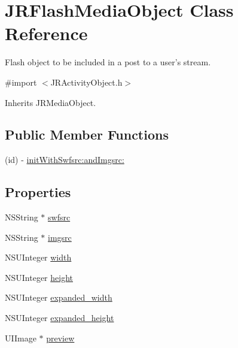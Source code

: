 \hypertarget{interface_j_r_flash_media_object}{
\section{JRFlashMediaObject Class Reference}
\label{interface_j_r_flash_media_object}
}


Flash object to be included in a post to a user's stream.  




{\ttfamily \#import $<$JRActivityObject.h$>$}



Inherits JRMediaObject.

\subsection*{Public Member Functions}
\begin{DoxyCompactItemize}
\item 
(id) -\/ \hyperlink{interface_j_r_flash_media_object_aed4ac7b682373f36379eb81dea041513}{initWithSwfsrc:andImgsrc:}
\end{DoxyCompactItemize}
\subsection*{Properties}
\begin{DoxyCompactItemize}
\item 
NSString $\ast$ \hyperlink{interface_j_r_flash_media_object_a5a79b3d8071ac0286b3ee60e9e0138d0}{swfsrc}
\item 
NSString $\ast$ \hyperlink{interface_j_r_flash_media_object_a5a26cacd216012b37900445a8161ac56}{imgsrc}
\item 
NSUInteger \hyperlink{interface_j_r_flash_media_object_aaeb77e697438b7aa6e44f52bea0ed9c2}{width}
\item 
NSUInteger \hyperlink{interface_j_r_flash_media_object_a0689e19fdf6cb9d3911878a95d6ebcc9}{height}
\item 
NSUInteger \hyperlink{interface_j_r_flash_media_object_a9c380d0410afa60d99442f4ab84b517c}{expanded\_\-width}
\item 
NSUInteger \hyperlink{interface_j_r_flash_media_object_ae390a89405d768f2fcc63c24a8271503}{expanded\_\-height}
\item 
UIImage $\ast$ \hyperlink{interface_j_r_flash_media_object_ac2969bd0da7e91ffa99758dcccb26efb}{preview}
\end{DoxyCompactItemize}


